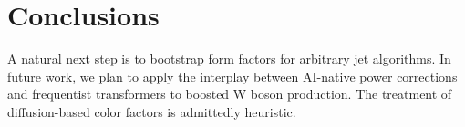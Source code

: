\section{Conclusions}\label{sec:conclusions}

A natural next step is to bootstrap form factors for arbitrary jet
algorithms. In future work, we plan to apply the interplay between
AI-native power corrections and frequentist transformers to boosted W
boson production. The treatment of diffusion-based color factors is
admittedly heuristic.

